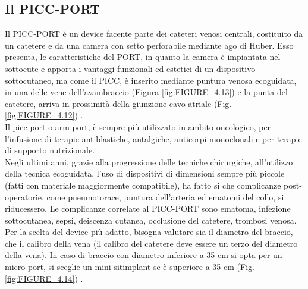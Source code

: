 \subsection{Il PICC-PORT}

Il PICC-PORT è un device facente parte dei cateteri venosi centrali, costituito da un catetere e da una camera con 
setto perforabile mediante ago di Huber. Esso presenta, le caratteristiche del PORT, in quanto la 
camera è impiantata nel sottocute e apporta i vantaggi funzionali ed estetici di un dispositivo sottocutaneo, 
ma come il PICC, è inserito mediante puntura venosa ecoguidata, in una delle vene dell'avambraccio \cite{MERLICCO}
(Figura \ref{fig:FIGURE_4.13})
e la punta del catetere, arriva in prossimità della giunzione cavo-atriale (Fig.\ref{fig:FIGURE_4.12}) \cite{CRO}.\\
Il picc-port o arm port, è sempre più utilizzato in ambito oncologico, per l'infusione di terapie antiblastiche, 
antalgiche, anticorpi monoclonali e per terapie di supporto nutrizionale\cite{GAVECELTPICCPORT}.\\
Negli ultimi anni, grazie alla progressione delle tecniche chirurgiche, all'utilizzo della tecnica ecoguidata, 
l'uso di dispositivi di dimensioni sempre più piccole (fatti con materiale maggiormente compatibile), ha fatto si che 
complicanze post-operatorie, come pneumotorace, puntura dell'arteria ed
ematomi del collo, si riducessero.
Le complicanze correlate al PICC-PORT sono ematoma, infezione sottocutanea, sepsi, deiscenza cutanea, occlusione del 
catetere, trombosi venosa.\\ 
Per la scelta del device più adatto, bisogna valutare sia il diametro del braccio, che il calibro della vena 
(il calibro del catetere deve essere un terzo del diametro della vena). In caso di braccio con diametro inferiore a 
35 cm si opta per un micro-port, si sceglie un mini-sitimplant se è superiore a 35 cm 
(Fig.\ref{fig:FIGURE_4.14}) \cite{GAVECELTPICCPORT}.

